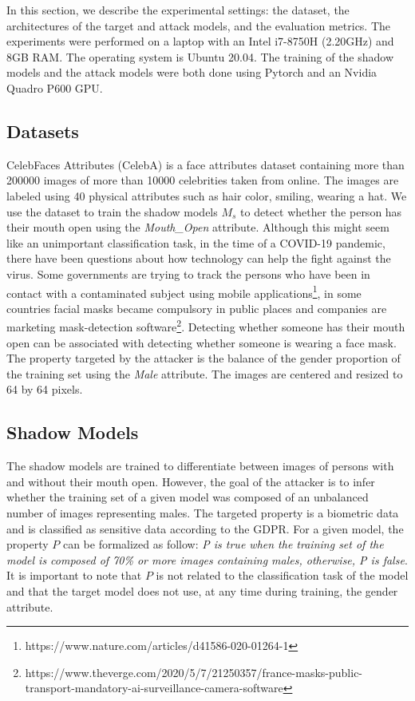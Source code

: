 \documentclass[11pt]{article}
\begin{document}
In this section, we describe the experimental settings: the dataset, the architectures of the target and attack models, and the evaluation metrics. The experiments were performed on a laptop with an Intel i7-8750H (2.20GHz) and 8GB RAM. The operating system is Ubuntu 20.04. The training of the shadow models and the attack models were both done using Pytorch and an Nvidia Quadro P600 GPU.\\

\subsection{Datasets}

CelebFaces Attributes (CelebA) \cite{liu2015faceattributes} is a face attributes dataset containing more than 200000 images of more than 10000 celebrities taken from online. The images are labeled using 40 physical attributes such as hair color, smiling, wearing a hat. We use the dataset to train the shadow models $M_s$ to detect whether the person has their mouth open using the \textit{Mouth\_Open} attribute. Although this might seem like an unimportant classification task, in the time of a COVID-19 pandemic, there have been questions about how technology can help the fight against the virus. Some governments are trying to track the persons who have been in contact with a contaminated subject using mobile applications\footnote{https://www.nature.com/articles/d41586-020-01264-1}, in some countries facial masks became compulsory in public places and companies are marketing mask-detection software\footnote{https://www.theverge.com/2020/5/7/21250357/france-masks-public-transport-mandatory-ai-surveillance-camera-software}. Detecting whether someone has their mouth open can be associated with detecting whether someone is wearing a face mask. The property targeted by the attacker is the balance of the gender proportion of the training set using the \textit{Male} attribute. The images are centered and resized to 64 by 64 pixels.\\

\subsection{Shadow Models}
The shadow models are trained to differentiate between images of persons with and without their mouth open.
However, the goal of the attacker is to infer whether the training set of a given model was composed of an unbalanced number of images representing males. The targeted property is a biometric data and is classified as sensitive data according to the GDPR. For a given model, the property $P$ can be formalized as follow: \textit{P is true when the training set of the model is composed of 70\% or more images containing males, otherwise, P is false}. It is important to note that $P$ is not related to the classification task of the model and that the target model does not use, at any time during training, the gender attribute.\\
\end{document}
